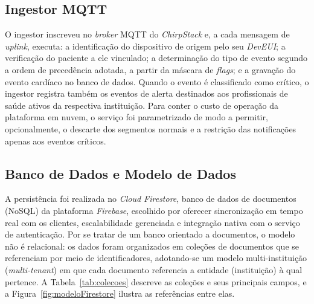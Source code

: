 \subsection{Ingestor MQTT}
\label{sec:ingestor}

O ingestor inscreveu no \textit{broker} \acs{MQTT} do \textit{ChirpStack} e, a cada mensagem de \textit{uplink}, executa: a identificação do dispositivo de origem pelo seu \textit{DevEUI}; a verificação do paciente a ele vinculado; a determinação do tipo de evento segundo a ordem de precedência adotada, a partir da máscara de \textit{flags}; e a gravação do evento cardíaco no banco de dados. Quando o evento é classificado como crítico, o ingestor registra também os eventos de alerta destinados aos profissionais de saúde ativos da respectiva instituição. Para conter o custo de operação da plataforma em nuvem, o serviço foi parametrizado de modo a permitir, opcionalmente, o descarte dos segmentos normais e a restrição das notificações apenas aos eventos críticos.

\subsection{Banco de Dados e Modelo de Dados}
\label{sec:bancoDados}

A persistência foi realizada no \textit{Cloud Firestore}, banco de dados de documentos (\acs{NoSQL}) da plataforma \textit{Firebase}, escolhido por oferecer sincronização em tempo real com os clientes, escalabilidade gerenciada e integração nativa com o serviço de autenticação. Por se tratar de um banco orientado a documentos, o modelo não é relacional: os dados foram organizados em coleções de documentos que se referenciam por meio de identificadores, adotando-se um modelo multi-instituição (\textit{multi-tenant}) em que cada documento referencia a entidade (instituição) à qual pertence. A Tabela~\ref{tab:colecoes} descreve as coleções e seus principais campos, e a Figura~\ref{fig:modeloFirestore} ilustra as referências entre elas.

